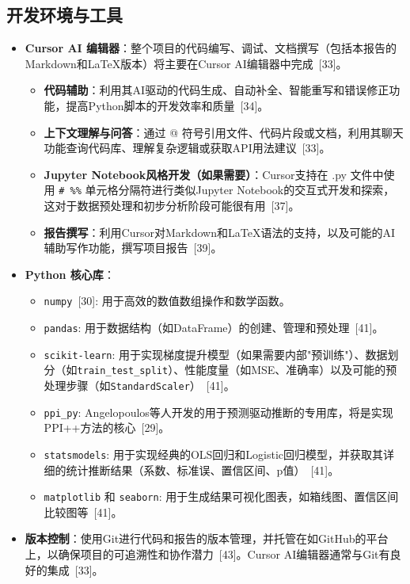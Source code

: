 \documentclass[12pt,a4paper]{article}
\begin{document}
\subsection{开发环境与工具}
\label{sec:dev_env_tools}
\begin{itemize}
    \item \textbf{Cursor AI 编辑器}：整个项目的代码编写、调试、文档撰写（包括本报告的Markdown和LaTeX版本）将主要在Cursor AI编辑器中完成~{[33]}。
    \begin{itemize}
        \item \textbf{代码辅助}：利用其AI驱动的代码生成、自动补全、智能重写和错误修正功能，提高Python脚本的开发效率和质量~{[34]}。
        \item \textbf{上下文理解与问答}：通过 @ 符号引用文件、代码片段或文档，利用其聊天功能查询代码库、理解复杂逻辑或获取API用法建议~{[33]}。
        \item \textbf{Jupyter Notebook风格开发（如果需要）}：Cursor支持在 .py 文件中使用 \texttt{\# \%\%} 单元格分隔符进行类似Jupyter Notebook的交互式开发和探索，这对于数据预处理和初步分析阶段可能很有用~{[37]}。
        \item \textbf{报告撰写}：利用Cursor对Markdown和LaTeX语法的支持，以及可能的AI辅助写作功能，撰写项目报告~{[39]}。
    \end{itemize}
    \item \textbf{Python 核心库}：
    \begin{itemize}
        \item \texttt{numpy}~{[30]}: 用于高效的数值数组操作和数学函数。
        \item \texttt{pandas}: 用于数据结构（如DataFrame）的创建、管理和预处理~{[41]}。
        \item \texttt{scikit-learn}: 用于实现梯度提升模型（如果需要内部"预训练"）、数据划分（如\texttt{train\_test\_split}）、性能度量（如MSE、准确率）以及可能的预处理步骤（如\texttt{StandardScaler}）~{[41]}。
        \item \texttt{ppi\_py}: Angelopoulos等人开发的用于预测驱动推断的专用库，将是实现PPI++方法的核心~{[29]}。
        \item \texttt{statsmodels}: 用于实现经典的OLS回归和Logistic回归模型，并获取其详细的统计推断结果（系数、标准误、置信区间、p值）~{[41]}。
        \item \texttt{matplotlib} 和 \texttt{seaborn}: 用于生成结果可视化图表，如箱线图、置信区间比较图等~{[41]}。
    \end{itemize}
    \item \textbf{版本控制}：使用Git进行代码和报告的版本管理，并托管在如GitHub的平台上，以确保项目的可追溯性和协作潜力~{[43]}。Cursor AI编辑器通常与Git有良好的集成~{[33]}。

\end{itemize}
\end{document}
